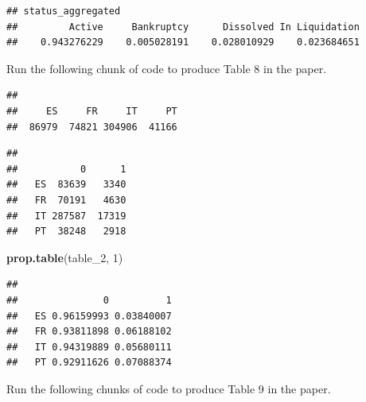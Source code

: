 \documentclass[]{article}
\newenvironment{Shaded}{\begin{snugshade}}{\end{snugshade}}
\newcommand{\DecValTok}[1]{\textcolor[rgb]{0.00,0.00,0.81}{#1}}
\newcommand{\KeywordTok}[1]{\textcolor[rgb]{0.13,0.29,0.53}{\textbf{#1}}}
\newcommand{\NormalTok}[1]{#1}
\newcommand{\OperatorTok}[1]{\textcolor[rgb]{0.81,0.36,0.00}{\textbf{#1}}}
\newcommand{\StringTok}[1]{\textcolor[rgb]{0.31,0.60,0.02}{#1}}
\begin{document}
\begin{verbatim}
## status_aggregated
##         Active     Bankruptcy      Dissolved In Liquidation 
##    0.943276229    0.005028191    0.028010929    0.023684651
\end{verbatim}

Run the following chunk of code to produce Table 8 in the paper.

\begin{Shaded}
\end{Shaded}

\begin{verbatim}
## 
##     ES     FR     IT     PT 
##  86979  74821 304906  41166
\end{verbatim}

\begin{Shaded}
\end{Shaded}

\begin{verbatim}
##     
##           0      1
##   ES  83639   3340
##   FR  70191   4630
##   IT 287587  17319
##   PT  38248   2918
\end{verbatim}

\begin{Shaded}
\begin{Highlighting}[]
\KeywordTok{prop.table}\NormalTok{(table_}\DecValTok{2}\NormalTok{, }\DecValTok{1}\NormalTok{)}
\end{Highlighting}
\end{Shaded}

\begin{verbatim}
##     
##               0          1
##   ES 0.96159993 0.03840007
##   FR 0.93811898 0.06188102
##   IT 0.94319889 0.05680111
##   PT 0.92911626 0.07088374
\end{verbatim}

Run the following chunks of code to produce Table 9 in the paper.

\begin{Shaded}
\end{Shaded}
\end{document}
